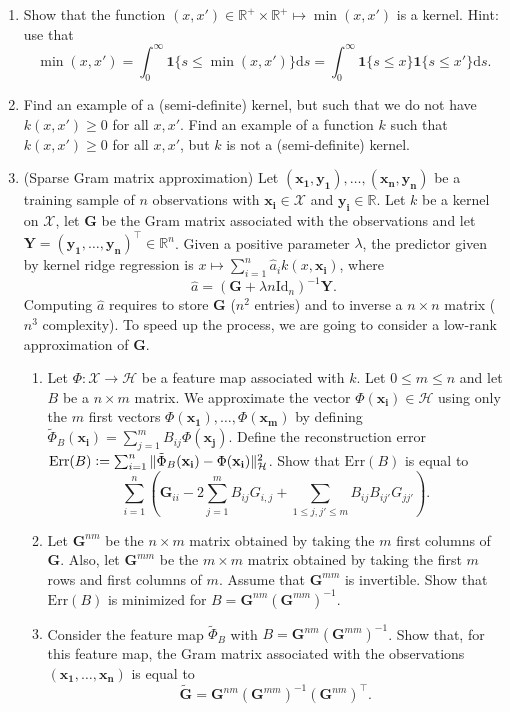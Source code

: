 \documentclass[12pt]{article}
\newcommand{\p}[1]{\left(#1 \right)}
\renewcommand{\b}[1]{\mathbf{#1 }}
\newcommand{\defeq}{\vcentcolon=}
\newcommand{\ones}{\mathbf{1}}
\newcommand{\dd}{\mathrm{d}}
\newcommand{\Id}{\mathrm{Id}}
\newcommand{\R}{\mathbb{R}}
\newcommand{\HH}{\mathcal{H}}
\newcommand{\XX}{\mathcal{X}}
\begin{document}
\begin{enumerate}
\item Show that the function $(x,x')\in \R^+\times \R^+ \mapsto \min(x,x')$ is a kernel. Hint: use that
\[\min(x,x') = \int_0^\infty \ones\{s\leq \min(x,x')\}\dd s = \int_0^\infty \ones\{s\leq x\}\ones\{s\leq x'\}\dd s.\]


\item Find an example of a (semi-definite) kernel, but such that we do not have $k(x,x')\geq 0$ for all $x,x'$. Find an example of a function $k$ such that $k(x,x')\geq 0$ for all $x,x'$, but $k$ is not a (semi-definite) kernel.


\item (Sparse Gram matrix approximation) Let $(\b{x_1},\b{y_1}),\dots,(\b{x_n},\b{y_n})$ be a training sample of $n$ observations with $\b{x_i}\in \XX$ and $\b{y_i}\in\R$. Let $k$ be a kernel on $\XX$, let $\b{G}$ be the Gram matrix associated with the observations and let $\b{Y}=(\b{y_1},\dots,\b{y_n})^\top \in \R^n$. Given a positive parameter $\lambda$, the predictor given by kernel ridge regression is $x\mapsto \sum_{i=1}^n \hat a_i k(x,\b{x_i})$, where 
\[
\hat a = (\b{G} + \lambda n\Id_n)^{-1}\b{Y}.
\]
Computing $\hat a$ requires to store $\b{G}$ ($n^2$ entries) and to inverse a $n\times n$ matrix ($n^3$ complexity). To speed up the process, we are going to consider a low-rank approximation of $\b{G}$.
\begin{enumerate}
\item Let $\Phi:\XX\to\HH$ be a feature map associated with $k$. Let $0\leq m\leq n$ and let $B$ be a $n\times m$ matrix. We approximate the vector $\Phi(\b{x_i})\in \HH$ using only the $m$ first vectors $\Phi(\b{x_1}),\dots,\Phi(\b{x_m})$ by defining $\tilde \Phi_B(\b{x_i}) = \sum_{j=1}^m B_{ij}\Phi(\b{x_j})$. Define the reconstruction error $\mathrm{Err}(B) \defeq \sum_{i=1}^n \|\tilde \Phi_B(\b{x_i})-\Phi(\b{x_i})\|^2_\HH$. Show that $\mathrm{Err}(B)$ is equal to
\[ \sum_{i=1}^n \p{\b{G}_{ii} - 2 \sum_{j=1}^m B_{ij}G_{i,j} + \sum_{1\leq j,j'\leq m} B_{ij}B_{ij'} G_{jj'}}.\]
\item Let $\b{G}^{nm}$ be the $n\times m$ matrix obtained by taking the $m$ first columns of $\b{G}$. Also, let $\b{G}^{mm}$ be the $m\times m$ matrix obtained by taking the first $m$ rows and first columns of $m$. Assume that $\b{G}^{mm}$ is invertible. Show that $\mathrm{Err}(B)$ is minimized for $B= \b{G}^{nm}(\b{G}^{mm})^{-1}$.
\item Consider the feature map $\tilde \Phi_B$ with $B= \b{G}^{nm}(\b{G}^{mm})^{-1}$. Show that, for this feature map, the Gram matrix associated with the observations $(\b{x_1},\dots,\b{x_n})$ is equal to
\[ \b{\tilde G} = \b{G}^{nm}(\b{G}^{mm})^{-1}(\b{G}^{nm})^\top.\]


\end{enumerate}
\end{enumerate}
\end{document}
